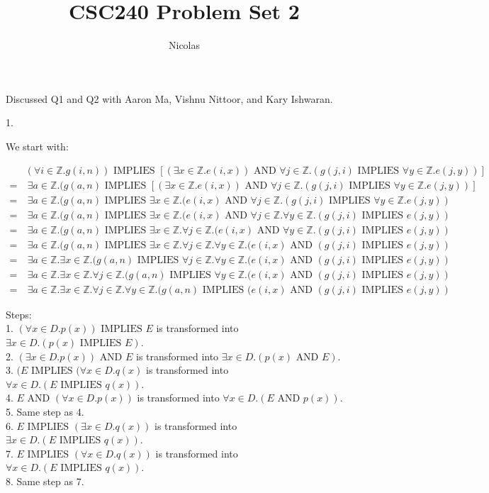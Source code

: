 \documentclass[11pt]{article}
\title{CSC240 Problem Set 2}
\author{Nicolas}
\newcommand{\Z}{\mathbb{Z}}
\newcommand{\Implies}{\mbox{ IMPLIES }}
\newcommand{\Andd}{\mbox{ AND }}
\begin{document}
\maketitle
\begin{flushleft}

Discussed Q1 and Q2 with Aaron Ma, Vishnu Nittoor, and Kary Ishwaran.

1.

We start with:

\begin{align*}
&  (\forall i \in \Z . g(i,n)) \Implies [(\exists x \in \Z . e(i,x)) \Andd \forall j \in \Z . (g(j,i) \Implies \forall y \in \Z . e(j,y))] \\
= & \ \exists a \in \Z . (g(a,n) \Implies [(\exists x \in \Z . e(i,x)) \Andd \forall j \in \Z . (g(j,i) \Implies \forall y \in \Z . e(j,y))] \\
= & \ \exists a \in \Z . (g(a,n) \Implies \exists x \in \Z . (e(i,x) \Andd \forall j \in \Z . (g(j,i) \Implies \forall y \in \Z  . e(j,y) ) \\
= & \ \exists a \in \Z . (g(a,n) \Implies \exists x \in \Z . (e(i,x) \Andd \forall j \in \Z . \forall y \in \Z . (g(j,i) \Implies e(j,y) ) \\
= & \ \exists a \in \Z . (g(a,n) \Implies \exists x \in \Z . \forall j \in \Z . (e(i,x) \Andd \forall y \in \Z . (g(j,i) \Implies e(j,y) ) \\
= & \ \exists a \in \Z . (g(a,n) \Implies \exists x \in \Z . \forall j \in \Z . \forall y \in \Z .  (e(i,x) \Andd (g(j,i) \Implies e(j,y) ) \\
= & \ \exists a \in \Z . \exists x \in \Z . (g(a,n) \Implies \forall j \in \Z . \forall y \in \Z .  (e(i,x) \Andd (g(j,i) \Implies e(j,y) ) \\
= & \ \exists a \in \Z . \exists x \in \Z . \forall j \in \Z . (g(a,n) \Implies \forall y \in \Z .  (e(i,x) \Andd (g(j,i) \Implies e(j,y) ) \\
= & \ \exists a \in \Z . \exists x \in \Z . \forall j \in \Z . \forall y \in \Z . (g(a,n) \Implies  (e(i,x) \Andd (g(j,i) \Implies e(j,y) )
\end{align*}

Steps: \\
1. $(\forall x \in D. p(x)) \Implies E$ is transformed into $\exists x \in D. (p(x) \Implies E)$. \\
2. $(\exists x \in D. p(x)) \Andd E$ is transformed into $\exists x \in D. (p(x) \Andd E)$. \\
3. $(E \Implies (\forall x \in D. q(x)$ is transformed into $\forall x \in D. (E \Implies q(x))$. \\
4. $E \Andd (\forall x \in D. p(x))$ is transformed into $\forall x \in D. (E \Andd p(x))$. \\
5. Same step as 4. \\
6. $E \Implies (\exists x \in D. q(x))$ is transformed into $\exists x \in D. (E \Implies q(x))$. \\
7. $E \Implies (\forall x \in D. q(x))$ is transformed into $\forall x \in D. (E \Implies q(x))$. \\
8. Same step as 7.



\end{flushleft}
\end{document}
